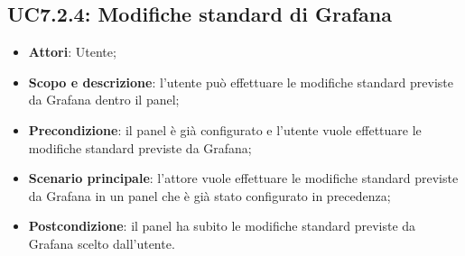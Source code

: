 \subsection{UC7.2.4: Modifiche standard di Grafana}
\hypertarget{UC7.2.4}{}
\begin{itemize}
	\item \textbf{Attori}: Utente;
	\item \textbf{Scopo e descrizione}: l'utente può effettuare le modifiche standard previste da Grafana dentro il panel;
	\item \textbf{Precondizione}: il panel è già configurato e l'utente vuole effettuare le modifiche standard previste da Grafana;
	\item \textbf{Scenario principale}: l'attore vuole effettuare le modifiche standard previste da Grafana in un panel che è già stato configurato in precedenza;
	\item \textbf{Postcondizione}: il panel ha subito le modifiche standard previste da Grafana scelto dall'utente.
\end{itemize}